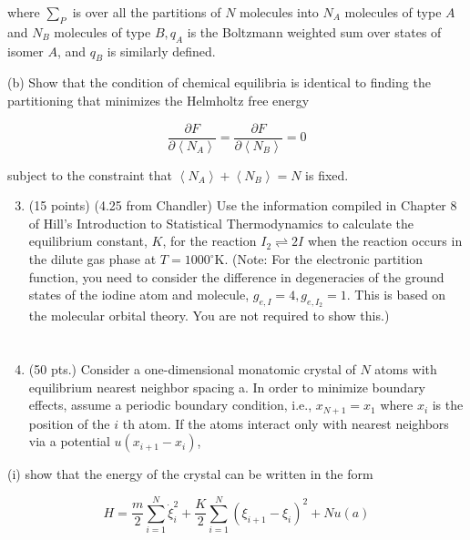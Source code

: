 \documentclass[12pt]{article}
\begin{document}
where $\sum_{P}$ is over all the partitions of $N$ molecules into $N_{A}$ molecules of type $A$ and $N_{B}$ molecules of type $B, q_{A}$ is the Boltzmann weighted sum over states of isomer $A$, and $q_{B}$ is similarly defined.

(b) Show that the condition of chemical equilibria is identical to finding the partitioning that minimizes the Helmholtz free energy


\begin{equation*}
\frac{\partial F}{\partial\left\langle N_{A}\right\rangle}=\frac{\partial F}{\partial\left\langle N_{B}\right\rangle}=0 \tag{5}
\end{equation*}


subject to the constraint that $\left\langle N_{A}\right\rangle+\left\langle N_{B}\right\rangle=N$ is fixed.

\begin{enumerate}
  \setcounter{enumi}{2}
  \item (15 points) (4.25 from Chandler) Use the information compiled in Chapter 8 of Hill's Introduction to Statistical Thermodynamics to calculate the equilibrium constant, $K$, for the reaction $I_{2} \rightleftharpoons 2 I$ when the reaction occurs in the dilute gas phase at $T=1000^{\circ} \mathrm{K}$. (Note: For the electronic partition function, you need to consider the difference in degeneracies of the ground states of the iodine atom and molecule, $g_{e, I}=4, g_{e, I_{2}}=1$. This is based on the molecular orbital theory. You are not required to show this.)
\section{}
  \item (50 pts.) Consider a one-dimensional monatomic crystal of $N$ atoms with equilibrium nearest neighbor spacing a. In order to minimize boundary effects, assume a periodic boundary condition, i.e., $x_{N+1}=x_{1}$ where $x_{i}$ is the position of the $i$ th atom. If the atoms interact only with nearest neighbors via a potential $u\left(x_{i+1}-x_{i}\right)$,

\end{enumerate}

(i) show that the energy of the crystal can be written in the form


\begin{equation*}
H=\frac{m}{2} \sum_{i=1}^{N} \dot{\xi}_{i}^{2}+\frac{K}{2} \sum_{i=1}^{N}\left(\xi_{i+1}-\xi_{i}\right)^{2}+N u(a) \tag{6}
\end{equation*}
\end{document}
